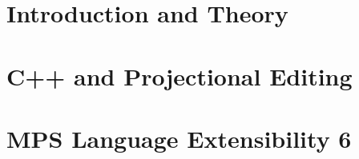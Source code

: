\documentclass[11pt,a4paper,bibtotoc,idxtotoc,headsepline,footsepline,footexclude,BCOR12mm,DIV13,hidelinks]{scrbook}
\begin{document}
	\frontmatter
	
	
	
%	
%	
	
	
%	
	\clearemptydoublepage
	
	
	
	
	
	
	
	
	

	\tableofcontents
  
  

	\mainmatter
	
	
		\part[Introduction and Theory]{Introduction and Theory}
		\label{part:intro}
		
		
		
		\part[C++ and Projectional Editing]{C++ and Projectional Editing}
		\label{part:implementation}
		
		
		
		
		\part[MPS Language Extensibility]{MPS Language Extensibility 6}
		\label{part:extensibility}
		
		
		
		
\end{document}
